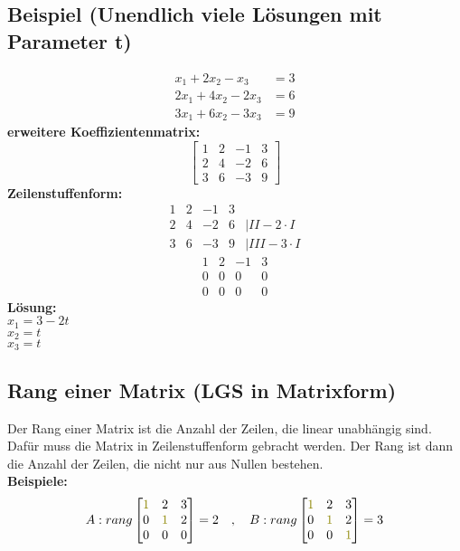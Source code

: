 \documentclass[12pt,a4paper]{article}
\begin{document}
\subsection{Beispiel (Unendlich viele Lösungen mit Parameter t)}
\begin{align*}
    x_1 + 2x_2 - x_3 &= 3 \\
    2x_1 + 4x_2 - 2x_3 &= 6 \\
    3x_1 + 6x_2 - 3x_3 &= 9
\end{align*}
\textbf{erweitere Koeffizientenmatrix:}
\[
\begin{bmatrix}
1 & 2 & -1 & 3 \\
2 & 4 & -2 & 6 \\
3 & 6 & -3 & 9
\end{bmatrix}
\]
\textbf{Zeilenstuffenform:}
\[
\begin{matrix}
1 & 2 & -1 & 3 \\
2 & 4 & -2 & 6 & \vert II - 2 \cdot I\\
3 & 6 & -3 & 9 & \vert III - 3 \cdot I
\end{matrix}
\]
\[
\begin{matrix}
1 & 2 & -1 & 3 \\
0 & 0 & 0 & 0 \\
0 & 0 & 0 & 0
\end{matrix}
\]
\textbf{Lösung:} \\
 $x_1 = 3 - 2t$ \\
$x_2 = t$ \\
$x_3 = t$


\subsection{Rang einer Matrix (LGS in Matrixform)}
Der Rang einer Matrix ist die Anzahl der Zeilen, die linear unabhängig sind. \\ Dafür muss die Matrix in Zeilenstuffenform gebracht werden. Der Rang ist dann die Anzahl der Zeilen, die nicht nur aus Nullen bestehen. \\
\textbf{Beispiele:}
\[
A:
rang
\begin{bmatrix}
\textcolor{olive}{1} & 2 & 3 \\
0 & \textcolor{olive}{1} & 2 \\
0 & 0 & 0
\end{bmatrix}
= 2
\quad
,
\quad
B:
rang
\begin{bmatrix}
\textcolor{olive}{1} & 2 & 3 \\
0 & \textcolor{olive}{1} & 2 \\
0 & 0 & \textcolor{olive}{1}
\end{bmatrix}
= 3
\]
\end{document}
